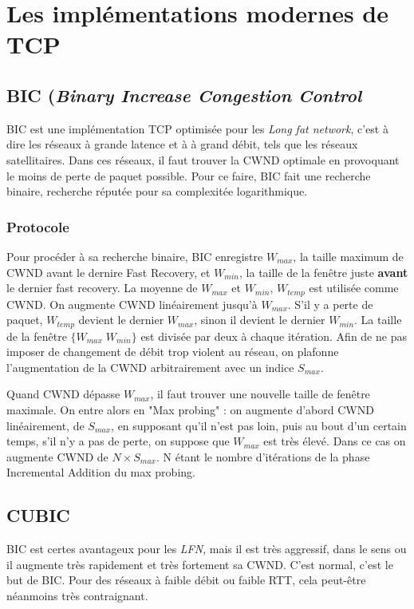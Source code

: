 \documentclass[	DIV=calc,%
							paper=a4,%
							fontsize=11pt,%
							twocolumn]{scrartcl}	 					%
\begin{document}
\section*{Les implémentations modernes de TCP}
\subsection*{BIC (\textit{\textbf{B}inary \textbf{I}ncrease \textbf{C}ongestion Control}}
BIC est une implémentation TCP optimisée pour les \textit{Long fat network}, c'est à dire les réseaux à grande latence et à à grand débit, tels que les réseaux satellitaires. Dans ces réseaux, il faut trouver la CWND optimale en provoquant le moins de perte de paquet possible. Pour ce faire, BIC fait une recherche binaire, recherche réputée pour sa complexitée logarithmique.

\subsubsection*{Protocole}
Pour procéder à sa recherche binaire, BIC enregistre $W_{max}$, la taille maximum de CWND avant le dernire Fast Recovery, et $W_{min}$, la taille de la fenêtre juste \textbf{avant} le dernier fast recovery. La moyenne de $W_{max}$ et $W_{min}$, $W_{temp}$ est utilisée comme CWND. On augmente CWND linéairement jusqu'à $W_{max}$. S'il y a perte de paquet, $W_{temp}$ devient le dernier $W_{max}$, sinon il devient le dernier $W_{min}$. La taille de la fenêtre $\{W_{max}\;W_{min}\}$ est divisée par deux à chaque itération. Afin de ne pas imposer de changement de débit trop violent au réseau, on plafonne l'augmentation de la CWND arbitrairement avec un indice $S_{max}$.

Quand CWND dépasse $W_{max}$, il faut trouver une nouvelle taille de fenêtre maximale. On entre alors en "Max probing" : on augmente d'abord CWND linéairement, de $S_{max}$, en supposant qu'il n'est pas loin, puis au bout d'un certain temps, s'il n'y a pas de perte, on suppose que $W_{max}$ est très élevé. Dans ce cas on augmente CWND de $N \times S_{max}$. N étant le nombre d'itérations de la phase Incremental Addition du max probing.

\subsection*{CUBIC}
BIC est certes avantageux pour les \textit{LFN}, mais il est très aggressif, dans le sens ou il augmente très rapidement et très fortement sa CWND. C'est normal, c'est le but de BIC. Pour des réseaux à faible débit ou faible RTT, cela peut-être néanmoins très contraignant.
\end{document}
